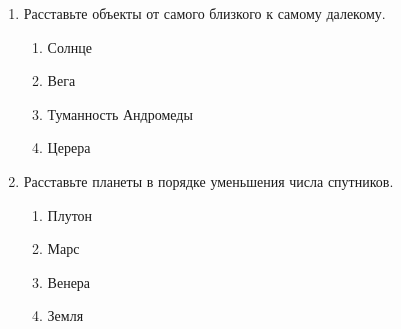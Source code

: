 \documentclass[12pt]{article}
\begin{document}
\begin{enumerate}
	\item Расставьте объекты от самого близкого к самому далекому.
	\begin{multicols}{2}
		\begin{enumerate}[label=\textbf{\Alph*.}]
			\item{Солнце} \item{Вега}
			\item{Туманность Андромеды} \item{Церера} 
		\end{enumerate}
	\end{multicols}

	\item Расставьте планеты в порядке уменьшения числа спутников.
	\begin{multicols}{2}
		\begin{enumerate}[label=\textbf{\Alph*.}]
			\item{Плутон} \item{Марс}
			\item{Венера} \item{Земля} 
		\end{enumerate}
	\end{multicols}
\end{enumerate}
\end{document}
